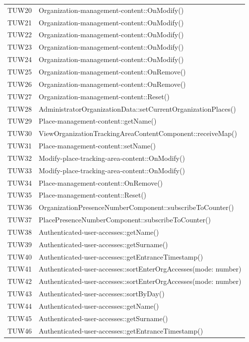 {\begin{longtable}{C{2cm} C{8cm}}
		TUW20 & Organization-management-content::OnModify() \\
		TUW21 & Organization-management-content::OnModify() \\
		TUW22 & Organization-management-content::OnModify() \\
		TUW23 & Organization-management-content::OnModify() \\
		TUW24 & Organization-management-content::OnModify() \\
		TUW25 & Organization-management-content::OnRemove() \\
		TUW26 & Organization-management-content::OnRemove() \\
		TUW27 & Organization-management-content::Reset() \\
		TUW28 & AdministratorOrganizationData::setCurrentOrganizationPlaces()\\
		TUW29 & Place-management-content::getName() \\
		TUW30 & ViewOrganizationTrackingAreaContentComponent::receiveMap() \\
		TUW31 & Place-management-content::setName() \\
		TUW32 & Modify-place-tracking-area-content::OnModify() \\
		TUW33 & Modify-place-tracking-area-content::OnModify() \\
		TUW34 & Place-management-content::OnRemove() \\
		TUW35 & Place-management-content::Reset() \\
		TUW36 & OrganizationPresenceNumberComponent::subscribeToCounter() \\
		TUW37 & PlacePresenceNumberComponent::subscribeToCounter() \\
		TUW38 & Authenticated-user-accesses::getName() \\
		TUW39 & Authenticated-user-accesses::getSurname() \\
		TUW40 & Authenticated-user-accesses::getEntranceTimestamp() \\
		TUW41 & Authenticated-user-accesses::sortEnterOrgAccesses(mode: number) \\
		TUW42 & Authenticated-user-accesses::sortEnterOrgAccesses(mode: number) \\
		TUW43 & Authenticated-user-accesses::sortByDay() \\
		TUW44 & Authenticated-user-accesses::getName() \\
		TUW45 & Authenticated-user-accesses::getSurname() \\
		TUW46 & Authenticated-user-accesses::getEntranceTimestamp() \\

\end{longtable}}
